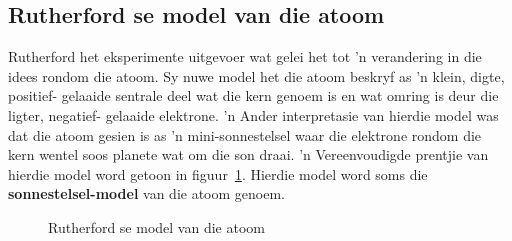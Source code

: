             \subsection*{Rutherford se model van die atoom}
            \nopagebreak
\begin{minipage}{.5\textwidth}
            \label{m38756*id254751}
Rutherford het eksperimente uitgevoer wat gelei het tot 'n verandering in die idees rondom die atoom. Sy nuwe model het die atoom beskryf as 'n klein, digte, positief- gelaaide sentrale deel wat die kern genoem is en wat omring is deur die ligter, negatief- gelaaide elektrone.  'n
Ander interpretasie van hierdie model was dat die atoom gesien is as 'n mini-sonnestelsel waar die elektrone rondom die kern wentel
soos planete wat om die son draai. 'n Vereenvoudigde prentjie van hierdie model word getoon in figuur~\ref{fig:atom:rutherfordmodel}. Hierdie model word soms die \textbf{sonnestelsel-model} van die atoom genoem. \par 
\end{minipage}
\begin{minipage}{.5\textwidth}
	\begin{figure}[H] %
    \begin{center}
\caption{Rutherford se model van die atoom}
\end{center}
\label{fig:atom:rutherfordmodel}
 \end{figure} 
\end{minipage}      
      \label{m38756*uid6}
